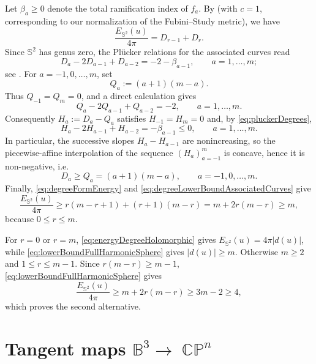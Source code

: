 \documentclass[11pt]{article}
\theoremstyle{plain}
\numberwithin{equation}{section}
\theoremstyle{definition}
\let\oldendproof\endproof
\renewenvironment{proof}[1][\proofname]{%
\oldproof[\upshape \bfseries #1]%
}{\oldendproof}
\def \mb{\mathbb}
\DeclareMathOperator{\CP}{\mathbb{CP}}
\begin{document}
\begin{proof}[Proof of Theorem \ref{thm:harmonicSphereDichotomyCPn}]
Let $\beta_a\geq0$ denote the total ramification index of $f_a$.  By
\cite[Proposition~7.1]{EellsWood1983}  (with $c=1$, corresponding to our normalization of the
Fubini--Study metric), we have
\begin{equation}
    \label{eq:degreeFormEnergy}
    \frac{E_{\mb S^2}(u)}{4\pi}=D_{r-1}+D_r.
\end{equation}
Since $\mb S^2$ has genus zero, the Pl\"ucker relations for the associated
curves read
\begin{equation}
    \label{eq:pluckerDegrees}
    D_a-2D_{a-1}+D_{a-2}=-2-\beta_{a-1},
    \qquad a=1,\ldots,m;
\end{equation}
see \cite[equation~(7.1)]{EellsWood1983}. For $a=-1,0,\ldots,m$, set
\[
    Q_a:=(a+1)(m-a).
\]
Thus $Q_{-1}=Q_m=0$, and a direct calculation gives
\[
    Q_a-2Q_{a-1}+Q_{a-2}=-2,
    \qquad a=1,\ldots,m.
\]
Consequently $H_a:=D_a-Q_a$ satisfies $H_{-1}=H_m=0$ and, by
\eqref{eq:pluckerDegrees},
\[
    H_a-2H_{a-1}+H_{a-2}=-\beta_{a-1}\leq0,
    \qquad a=1,\ldots,m.
\]
In particular, the successive slopes $H_a-H_{a-1}$ are nonincreasing, so
the piecewise-affine interpolation of the sequence $(H_a)_{a=-1}^m$ is
concave, hence it is non-negative, i.e.\
\begin{equation}
    \label{eq:degreeLowerBoundAssociatedCurves}
    D_a\geq Q_a=(a+1)(m-a),
    \qquad a=-1,0,\ldots,m.
\end{equation}
Finally, \eqref{eq:degreeFormEnergy} and
\eqref{eq:degreeLowerBoundAssociatedCurves} give
\begin{equation}
    \label{eq:lowerBoundFullHarmonicSphere}
    \frac{E_{\mb S^2}(u)}{4\pi}
    \geq r(m-r+1)+(r+1)(m-r)
    =m+2r(m-r)\geq m,
\end{equation}
because $0\leq r\leq m$.

For $r=0$ or $r=m$, \eqref{eq:energyDegreeHolomorphic} gives
$E_{\mb S^2}(u)=4\pi|d(u)|$, while
\eqref{eq:lowerBoundFullHarmonicSphere} gives $|d(u)|\geq m$.  Otherwise
$m\geq2$ and $1\leq r\leq m-1$.  Since
$r(m-r)\geq m-1$, \eqref{eq:lowerBoundFullHarmonicSphere} gives
\[
    \frac{E_{\mb S^2}(u)}{4\pi}
    \geq m+2r(m-r)\geq3m-2\geq4,
\]
which proves the second alternative.
\end{proof}


\section{Tangent maps \texorpdfstring{$\mb B^3\to \CP^n$}{B3 to CPn}}\label{sec:B3CPn}
\end{document}
